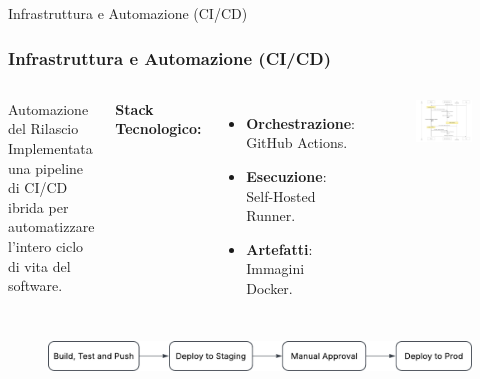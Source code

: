 \documentclass[8pt]{beamer}
\begin{document}
\begin{frame}{Infrastruttura e Automazione (CI/CD)}
  \frametitle{Infrastruttura e Automazione (CI/CD)}

  \begin{columns}[T]
    \begin{block}{Automazione del Rilascio}
      Implementata una pipeline di CI/CD ibrida per automatizzare l'intero ciclo di vita del software.
    \end{block}

    \textbf{Stack Tecnologico:}
    \begin{itemize}
      \item \textbf{Orchestrazione}: GitHub Actions.
      \item \textbf{Esecuzione}: Self-Hosted Runner.
      \item \textbf{Artefatti}: Immagini Docker.
    \end{itemize}

    \begin{figure}
      \includegraphics[width=\textwidth]{figures/pipeline_sequence.pdf}
    \end{figure}
  \end{columns}

  \vfill %

  \begin{center}
   \begin{figure}
      \includegraphics[width=\textwidth]{figures/workflow.pdf}
    \end{figure}
  \end{center}

\end{frame}
\end{document}
